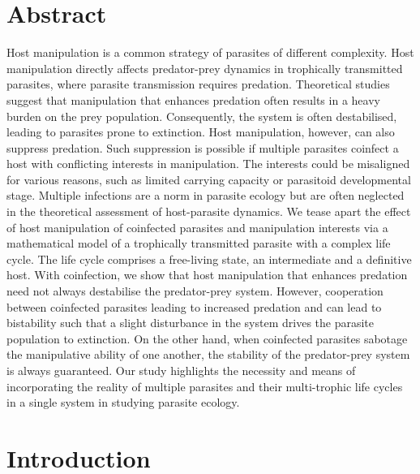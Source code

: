 \documentclass[11pt]{article}
\begin{document}
\section*{Abstract}
Host manipulation is a common strategy of parasites of different complexity. 
Host manipulation directly affects predator-prey dynamics in trophically transmitted parasites, where parasite transmission requires predation. Theoretical studies suggest that manipulation that enhances predation often results in a heavy burden on the prey population. 
Consequently, the system is often destabilised, leading to parasites prone to extinction. 
Host manipulation, however, can also suppress predation.
Such suppression is possible if multiple parasites coinfect a host with conflicting interests in manipulation. 
The interests could be misaligned for various reasons, such as limited carrying capacity or parasitoid developmental stage.
Multiple infections are a norm in parasite ecology but are often neglected in the theoretical assessment of host-parasite dynamics.
We tease apart the effect of host manipulation of coinfected parasites and manipulation interests via a mathematical model of a trophically transmitted parasite with a complex life cycle.
The life cycle comprises a free-living state, an intermediate and a definitive host. 
With coinfection, we show that host manipulation that enhances predation need not always destabilise the predator-prey system. 
However, cooperation between coinfected parasites leading to increased predation and can lead to bistability such that a slight disturbance in the system drives the parasite population to extinction. 
On the other hand, when coinfected parasites sabotage the manipulative ability of one another, the stability of the predator-prey system is always guaranteed.
Our study highlights the necessity and means of incorporating the reality of multiple parasites and their multi-trophic life cycles in a single system in studying parasite ecology.

\newpage{}

\section*{Introduction}

\end{document}
